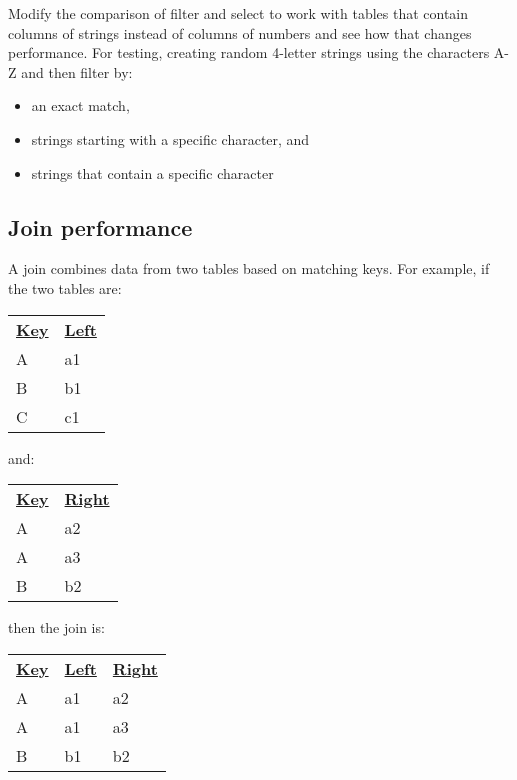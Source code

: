 \documentclass{scrbook}
\begin{document}
Modify the comparison of filter and select to work with tables
that contain columns of strings instead of columns of numbers
and see how that changes performance.
For testing,
creating random 4-letter strings using the characters A-Z
and then filter by:

\begin{itemize}

\item an exact match,

\item strings starting with a specific character, and

\item strings that contain a specific character

\end{itemize}

\subsection*{Join performance}


A join combines data from two tables based on matching keys.
For example,
if the two tables are:


\vspace{\baselineskip}
\begin{tabular}{ll}
\textbf{\underline{Key}} & \textbf{\underline{Left}} \\
A & a1 \\
B & b1 \\
C & c1 \\
\end{tabular}

\vspace{\baselineskip}


\noindent and:


\vspace{\baselineskip}
\begin{tabular}{ll}
\textbf{\underline{Key}} & \textbf{\underline{Right}} \\
A & a2 \\
A & a3 \\
B & b2 \\
\end{tabular}

\vspace{\baselineskip}


\noindent then the join is:


\vspace{\baselineskip}
\begin{tabular}{lll}
\textbf{\underline{Key}} & \textbf{\underline{Left}} & \textbf{\underline{Right}} \\
A & a1 & a2 \\
A & a1 & a3 \\
B & b1 & b2 \\
\end{tabular}
\end{document}
